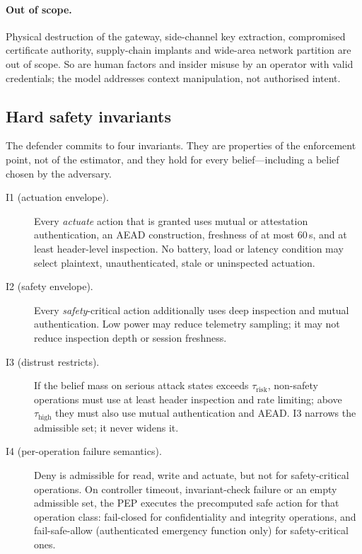 \paragraph{Out of scope.} Physical destruction of the gateway, side-channel key
extraction, compromised certificate authority, supply-chain implants and
wide-area network partition are out of scope. So are human factors and
insider misuse by an operator with valid credentials; the model addresses
context manipulation, not authorised intent.

\subsection{Hard safety invariants}
\label{sec:invariants}

The defender commits to four invariants. They are properties of the enforcement
point, not of the estimator, and they hold for every belief---including a belief
chosen by the adversary.

\begin{description}
  \item[I1 (actuation envelope).] Every \emph{actuate} action that is granted
  uses mutual or attestation authentication, an AEAD construction, freshness of
  at most 60\,s, and at least header-level inspection. No battery, load or
  latency condition may select plaintext, unauthenticated, stale or uninspected
  actuation.
  \item[I2 (safety envelope).] Every \emph{safety}-critical action additionally
  uses deep inspection and mutual authentication. Low power may reduce telemetry
  sampling; it may not reduce inspection depth or session freshness.
  \item[I3 (distrust restricts).] If the belief mass on serious attack states
  exceeds $\tau_{\mathrm{risk}}$, non-safety operations must use at least header
  inspection and rate limiting; above $\tau_{\mathrm{high}}$ they must also use
  mutual authentication and AEAD. I3 narrows the admissible set; it never
  widens it.
  \item[I4 (per-operation failure semantics).] Deny is admissible for read,
  write and actuate, but not for safety-critical operations. On controller
  timeout, invariant-check failure or an empty admissible set, the PEP executes
  the precomputed safe action for that operation class: fail-closed for
  confidentiality and integrity operations, and fail-safe-allow (authenticated
  emergency function only) for safety-critical ones.
\end{description}

